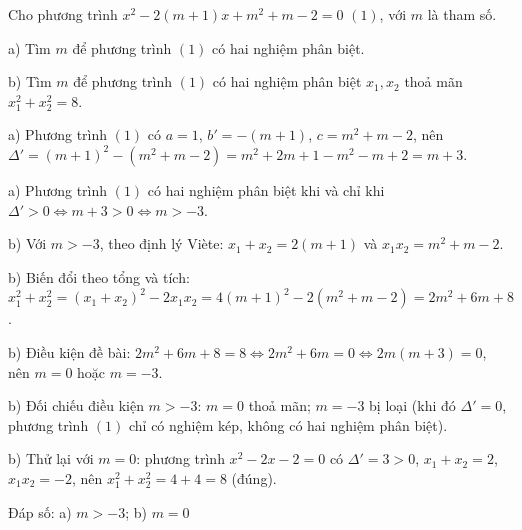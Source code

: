 \begin{problem}[9DS-PT2-045]
Cho phương trình $x^2 - 2(m + 1)x + m^2 + m - 2 = 0$ $(1)$, với $m$ là tham số.

a) Tìm $m$ để phương trình $(1)$ có hai nghiệm phân biệt.

b) Tìm $m$ để phương trình $(1)$ có hai nghiệm phân biệt $x_1, x_2$ thoả mãn $x_1^2 + x_2^2 = 8$.

\begin{solution}
a) Phương trình $(1)$ có $a = 1$, $b' = -(m + 1)$, $c = m^2 + m - 2$, nên $\Delta' = (m + 1)^2 - (m^2 + m - 2) = m^2 + 2m + 1 - m^2 - m + 2 = m + 3$.

a) Phương trình $(1)$ có hai nghiệm phân biệt khi và chỉ khi $\Delta' > 0 \Leftrightarrow m + 3 > 0 \Leftrightarrow m > -3$.

b) Với $m > -3$, theo định lý Viète: $x_1 + x_2 = 2(m + 1)$ và $x_1x_2 = m^2 + m - 2$.

b) Biến đổi theo tổng và tích: $x_1^2 + x_2^2 = (x_1 + x_2)^2 - 2x_1x_2 = 4(m + 1)^2 - 2(m^2 + m - 2) = 2m^2 + 6m + 8$.

b) Điều kiện đề bài: $2m^2 + 6m + 8 = 8 \Leftrightarrow 2m^2 + 6m = 0 \Leftrightarrow 2m(m + 3) = 0$, nên $m = 0$ hoặc $m = -3$.

b) Đối chiếu điều kiện $m > -3$: $m = 0$ thoả mãn; $m = -3$ bị loại (khi đó $\Delta' = 0$, phương trình $(1)$ chỉ có nghiệm kép, không có hai nghiệm phân biệt).

b) Thử lại với $m = 0$: phương trình $x^2 - 2x - 2 = 0$ có $\Delta' = 3 > 0$, $x_1 + x_2 = 2$, $x_1x_2 = -2$, nên $x_1^2 + x_2^2 = 4 + 4 = 8$ (đúng).

Đáp số: a) $\boxed{m > -3}$; b) $\boxed{m = 0}$
\end{solution}
\end{problem}

